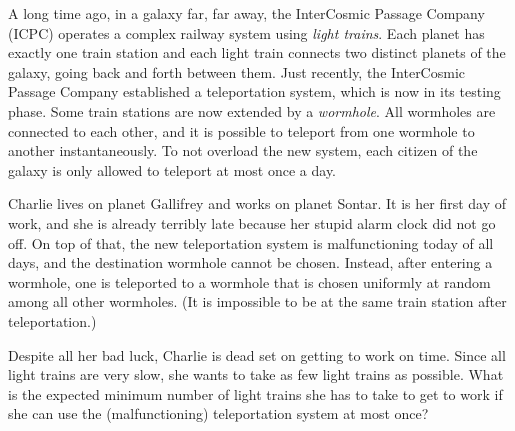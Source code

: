 
%
A long time ago, in a galaxy far, far away, the InterCosmic Passage Company (ICPC) operates a complex railway system using \emph{light trains}.
Each planet has exactly one train station and each light train connects two distinct planets of the galaxy, going back and forth between them. 
Just recently, the InterCosmic Passage Company established a teleportation system, which is now in its testing phase. 
Some train stations are now extended by a \emph{wormhole}. 
All wormholes are connected to each other, and it is possible to teleport from one wormhole to another instantaneously. 
To not overload the new system, each citizen of the galaxy is only allowed to teleport at most once a day.   

Charlie lives on planet Gallifrey and works on planet Sontar. 
It is her first day of work, and she is already terribly late because her stupid alarm clock did not go off. 
On top of that, the new teleportation system is malfunctioning today of all days, and the destination wormhole cannot be chosen.
Instead, after entering a wormhole, one is teleported to a wormhole that is chosen uniformly at random among all other wormholes.
(It is impossible to be at the same train station after teleportation.)

Despite all her bad luck, Charlie is dead set on getting to work on time. 
Since all light trains are very slow, she wants to take as few light trains as possible. 
What is the expected minimum number of light trains she has to take to get to work if she can use the (malfunctioning) teleportation system at most once?  




